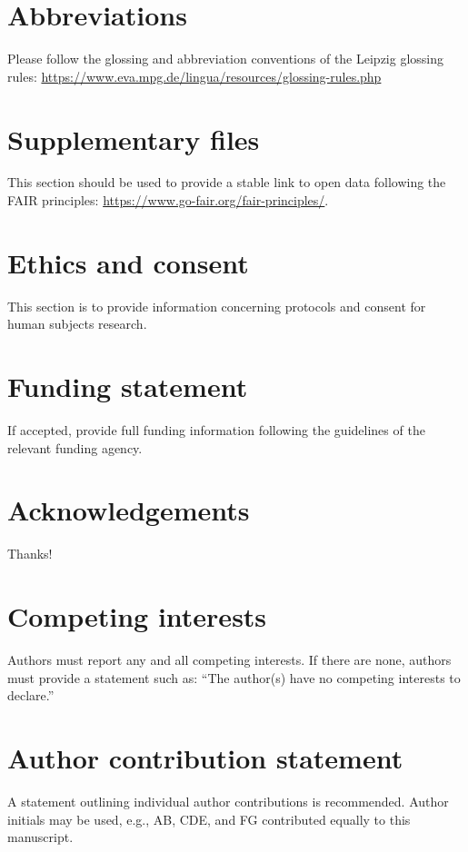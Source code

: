 \documentclass[
  journal=Notes,
  manuscript=for-review,
  year=2023,
  volume=x:x,
]{continua-journal}
\begin{document}
\section*{Abbreviations} %
Please follow the glossing and abbreviation conventions of the Leipzig glossing rules: \url{https://www.eva.mpg.de/lingua/resources/glossing-rules.php}

\section*{Supplementary files} %
This section should be used to provide a stable link to open data following the FAIR principles: \url{https://www.go-fair.org/fair-principles/}.

\section*{Ethics and consent} %
This section is to provide information concerning protocols and consent for human subjects research.

\section*{Funding statement} %
If accepted, provide full funding information following the guidelines of the relevant funding agency.

\section*{Acknowledgements} %
Thanks!

\section*{Competing interests} %
 Authors must report any and all competing interests. If there are none, authors must provide a statement such as: ``The author(s) have no competing interests to declare.''
 
\section*{Author contribution statement} %
A statement outlining individual author contributions is recommended. Author initials may be used, e.g., AB, CDE, and FG contributed equally to this manuscript.

\nocite{conklin18,grosjeanpy91,putnam2018,putnam2019,putnam2020OFOH,putnam2020lex,polinsky18,wiltschko2014universal,hall2007,lardiere2008}

\printbibliography
\end{document}
